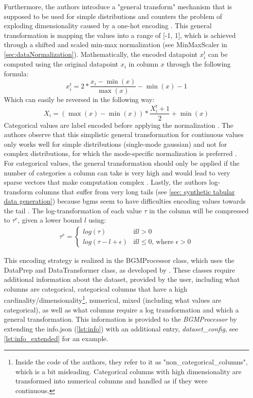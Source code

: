 Furthermore, the authors introduce a "general transform" mechanism \cite[p. 7]{zhao2022CTABGANEnhancingTabular} that is supposed to be used for simple distributions and counters the problem of exploding dimensionality caused by a one-hot encoding \cite{zhao2022CTABGANEnhancingTabular}.
This general transformation is mapping the values into a range of [-1, 1], which is achieved through a shifted and scaled min-max normalization (see MinMaxScaler in \autoref{sec:dataNormalization}).
Mathematically, the encoded datapoint $x^t_i$ can be computed using the original datapoint $x_i$ in column $x$ through the following formula:
$$x^t_i=2* \frac{x_i-\min(x)}{\max(x)}-\min(x)-1$$
Which can easily be reversed in the following way:
$$X_i = (\max(x)-\min(x))*\frac{X^t_i+1}{2}+\min(x)$$
Categorical values are label encoded before applying the normalization \cite{zhao2022CTABGANEnhancingTabular}.
The authors observe that this simplistic general transformation for continuous values only works well for simple distributions (\eg single-mode gaussian) and not for complex distributions, for which the mode-specific normalization is preferred \cite{zhao2022CTABGANEnhancingTabular}.
For categorical values, the general transformation should only be applied if the number of categories a column can take is very high and would lead to very sparse vectors that make computation complex \cite{zhao2022CTABGANEnhancingTabular}.
Lastly, the authors log-transform columns that suffer from very long tails (see \autoref{sec: synthetic tabular data generation}) because \Glspl{bgm} seem to have difficulties encoding values towards the tail \cite{zhao2022CTABGANEnhancingTabular}.
The log-transformation of each value $\tau$ in the column will be compressed to $\tau^e$, given a lower bound $l$ using:
\begin{equation}
	\label{eqn:log-transform}
	\begin{align*}
		\tau^e =
		\begin{cases}
			log(\tau)            & \text{if} l>0                                 \\
			log(\tau-l+\epsilon) & \text{if} l\leq0 \text{, where } \epsilon > 0
		\end{cases}
	\end{align*}
\end{equation}

This encoding strategy is realized in the BGMProcessor class, which uses the DataPrep and DataTransformer class, as developed by \cite{zhao2022CTABGANEnhancingTabular}.
These classes require additional information about the dataset, provided by the user, including what columns are categorical, categorical columns that have a high cardinality/dimensionality\footnote{Inside the code of the authors, they refer to it as "non_categorical_columns", which is a bit misleading. Categorical columns with high dimensionality are transformed into numerical columns and handled as if they were continuous.},
numerical, mixed (including what values are categorical), as well as what columns require a log transformation and which a general transformation.
This information is provided to the \textit{BGMProcessor} by extending the info.json (\autoref{lst:info}) with an additional entry, \textit{dataset\_config}, see \autoref{lst:info_extended} for an example.

